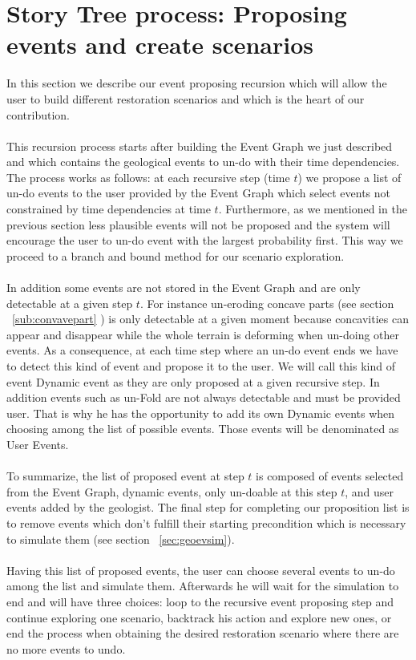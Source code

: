 \documentclass[12pt, a4paper]{report} %
\begin{document}
\section{Story Tree process: Proposing events and create scenarios} 
\label{sec:storytree}
In this section we describe our event proposing recursion which will allow the user to build different restoration scenarios and which is the heart of our contribution.\\\\
This recursion process starts after building the Event Graph we just described and which contains the geological events to un-do with their time dependencies. The process works as follows: at each recursive step (time $t$) we propose a list of un-do events to the user provided by the Event Graph which select events not constrained by time dependencies at time $t$. Furthermore, as we mentioned in the previous section less plausible events will not be proposed and the system will encourage the user to un-do event with the largest probability first. This way we proceed to a branch and bound method for our scenario exploration. \\\\
In addition some events are not stored in the Event Graph and are only detectable at a given step $t$. For instance un-eroding concave parts (see section ~\ref{sub:convavepart} ) is only detectable at a given moment because concavities can appear and disappear while the whole terrain is deforming when un-doing other events. As a consequence, at each time step where an un-do event ends we have to detect this kind of event and propose it to the user. We will call this kind of event Dynamic event as they are only proposed at a given recursive step. In addition events such as un-Fold are not always detectable and must be provided user. That is why he has the opportunity to add its own Dynamic events when choosing among the list of possible events. Those events will be denominated as User Events.\\\\
To summarize, the list of proposed event at step $t$ is composed of events selected from the Event Graph, dynamic events, only un-doable at this step $t$, and user events added by the geologist. The final step for completing our proposition list is to remove events which don't fulfill their starting precondition which is necessary to simulate them (see section ~\ref{sec:geoevsim}).\\\\
Having this list of proposed events, the user can choose several events to un-do among the list and simulate them. Afterwards he will wait for the simulation to end and will have three choices: loop to the recursive event proposing step and continue exploring one scenario, backtrack his action and explore new ones, or end the process when obtaining the desired restoration scenario where there are no more events to undo.\\\\
\end{document}
